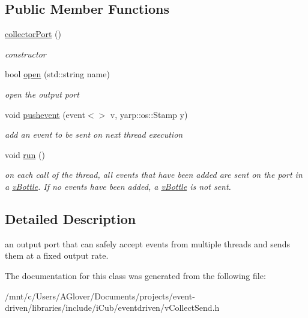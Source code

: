 \subsection*{Public Member Functions}
\begin{DoxyCompactItemize}
\item 
\mbox{\label{classev_1_1collectorPort_ac7cd1de9c40bd46df66b67ae824bb258}} 
\hyperlink{classev_1_1collectorPort_ac7cd1de9c40bd46df66b67ae824bb258}{collector\+Port} ()
\begin{DoxyCompactList}\small\item\em constructor \end{DoxyCompactList}\item 
\mbox{\label{classev_1_1collectorPort_a164072ae38c4e115873c451984b8e7f4}} 
bool \hyperlink{classev_1_1collectorPort_a164072ae38c4e115873c451984b8e7f4}{open} (std\+::string name)
\begin{DoxyCompactList}\small\item\em open the output port \end{DoxyCompactList}\item 
\mbox{\label{classev_1_1collectorPort_ab1d587f6b728b65b22df73bbe674607d}} 
void \hyperlink{classev_1_1collectorPort_ab1d587f6b728b65b22df73bbe674607d}{pushevent} (event$<$$>$ v, yarp\+::os\+::\+Stamp y)
\begin{DoxyCompactList}\small\item\em add an event to be sent on next thread execution \end{DoxyCompactList}\item 
\mbox{\label{classev_1_1collectorPort_a7ec227ae78ec71ca8867a20ae815ea7d}} 
void \hyperlink{classev_1_1collectorPort_a7ec227ae78ec71ca8867a20ae815ea7d}{run} ()
\begin{DoxyCompactList}\small\item\em on each call of the thread, all events that have been added are sent on the port in a \hyperlink{classev_1_1vBottle}{v\+Bottle}. If no events have been added, a \hyperlink{classev_1_1vBottle}{v\+Bottle} is not sent. \end{DoxyCompactList}\end{DoxyCompactItemize}


\subsection{Detailed Description}
an output port that can safely accept events from multiple threads and sends them at a fixed output rate. 

The documentation for this class was generated from the following file\+:\begin{DoxyCompactItemize}
\item 
/mnt/c/\+Users/\+A\+Glover/\+Documents/projects/event-\/driven/libraries/include/i\+Cub/eventdriven/v\+Collect\+Send.\+h\end{DoxyCompactItemize}
